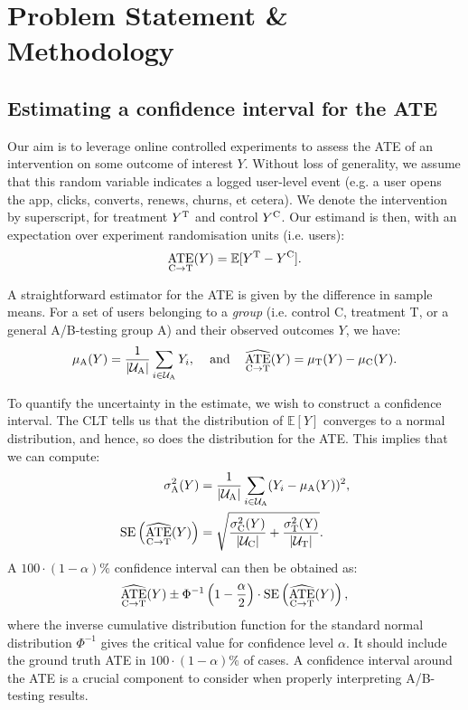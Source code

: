 
\section{Problem Statement \& Methodology}
\subsection{Estimating a confidence interval for the ATE}
Our aim is to leverage online controlled experiments to assess the ATE of an intervention on some outcome of interest $Y$.
Without loss of generality, we assume that this random variable indicates a logged user-level event (e.g. a user opens the app, clicks, converts, renews, churns, et cetera).
We denote the intervention by superscript, for treatment $Y^{\rm T}$ and control $Y^{\rm C}$.
Our estimand is then, with an expectation over experiment randomisation units (i.e. users):
\begin{equation}
    \mathop{\rm ATE}\limits_{{\rm C} \to {\rm T}}(Y) = \mathbb{E}[Y^{\rm T}-Y^{\rm  C}].
\end{equation}

A straightforward estimator for the ATE is given by the difference in sample means.
For a set of users belonging to a \emph{group} (i.e. control C, treatment T, or a general A/B-testing group A) and their observed outcomes $Y$, we have:
\begin{equation}
    \mu_{\rm A}(Y) = \frac{1}{|\mathcal{U}_{\rm A}|} \sum_{i \in \mathcal{U}_{\rm A}} Y_i,\, \, \, \, \enskip \text{and} \, \, \, \, \enskip \widehat{\mathop{\rm ATE}\limits_{{\rm C} \to {\rm T}}}(Y)  =  \mu_{\rm T}(Y) - \mu_{\rm C}(Y).
\end{equation}

To quantify the uncertainty in the estimate, we wish to construct a confidence interval.
The CLT tells us that the distribution of $\mathbb{E}[Y]$ converges to a normal distribution, and hence, so does the distribution for the ATE.
This implies that we can compute:
\begin{align}
    \sigma^{2}_{\rm A}(Y) &= \frac{1}{|\mathcal{U}_{\rm A}|}\sum_{i \in \mathcal{U}_{\rm A}}(Y_i - \mu_{\rm A}(Y))^{2}, \\
   \text{SE}\left(\widehat{\mathop{\rm ATE}\limits_{{\rm C} \to {\rm T}}}(Y)\right) &= \sqrt{\frac{\sigma^{2}_{\rm C}(Y)}{|\mathcal{U}_{\rm C}|} + \frac{\sigma^{2}_{\rm T}(\rm Y)}{|\mathcal{U}_{\rm T}|}}.
\end{align}
A $100\cdot(1-\alpha)\%$ confidence interval can then be obtained as:
\begin{equation}
    \widehat{\mathop{\rm ATE}\limits_{{\rm C} \to {\rm T}}}(Y) \pm  \Phi^{-1}\left(1-\frac{\alpha}{2}\right)\cdot\text{SE}\left(\widehat{\mathop{\rm ATE}\limits_{{\rm C} \to {\rm T}}}(Y)\right),
\end{equation}
where the inverse cumulative distribution function for the standard normal distribution $\Phi^{-1}$ gives the critical value for confidence level $\alpha$.
It should include the ground truth ATE in $100\cdot(1-\alpha)\%$ of cases.
A confidence interval around the ATE is a crucial component to consider when properly interpreting A/B-testing results.

